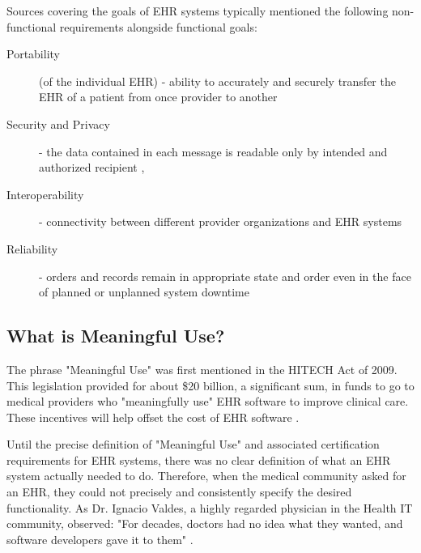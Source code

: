 \documentclass[10pt]{article}
\begin{document}
Sources covering the goals of EHR systems typically mentioned the following non-functional requirements alongside functional goals:

\begin{description}
	\item[Portability] (of the individual EHR) - ability to accurately and securely transfer the EHR of a patient from once provider to another \cite{ehrbook}
	\item[Security and Privacy] - the data contained in each message is readable only by intended and authorized recipient \cite{ehrbook}, \cite{auditingprivacy}
	\item[Interoperability] - connectivity between different provider organizations and EHR systems \cite{ehrbook}
	\item[Reliability] - orders and records remain in appropriate state and order even in the face of planned or unplanned system downtime  \cite{ehrbook}
\end{description}




\subsection{What is Meaningful Use?}
\label{sec:Define Meaningful Use}

The phrase "Meaningful Use" was first mentioned in the HITECH Act of 2009.
This legislation provided for about \$20 billion, a significant sum, in funds to go to medical providers who "meaningfully use" EHR software to improve clinical care.
These incentives will help offset the cost of EHR software \cite{health-hack}.

Until the precise definition of "Meaningful Use" and associated certification requirements for EHR systems, there was no clear definition of what an EHR system actually needed to do.
Therefore, when the medical community asked for an EHR, they could not precisely and consistently specify the desired functionality.
As Dr. Ignacio Valdes, a highly regarded physician in the Health IT community, observed: "For decades, doctors had no idea what they wanted, and software developers gave it to them" \cite{health-hack}.
\end{document}
